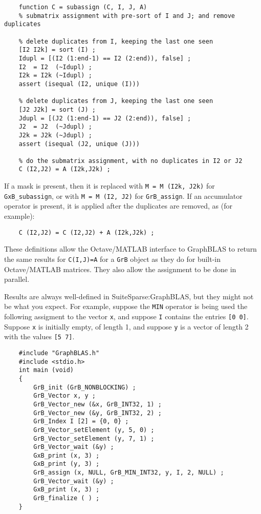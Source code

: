 \documentclass[12pt]{article}
\begin{document}
{{\small
\begin{verbatim}
    function C = subassign (C, I, J, A)
    % submatrix assignment with pre-sort of I and J; and remove duplicates

    % delete duplicates from I, keeping the last one seen
    [I2 I2k] = sort (I) ;
    Idupl = [(I2 (1:end-1) == I2 (2:end)), false] ;
    I2  = I2  (~Idupl) ;
    I2k = I2k (~Idupl) ;
    assert (isequal (I2, unique (I)))

    % delete duplicates from J, keeping the last one seen
    [J2 J2k] = sort (J) ;
    Jdupl = [(J2 (1:end-1) == J2 (2:end)), false] ;
    J2  = J2  (~Jdupl) ;
    J2k = J2k (~Jdupl) ;
    assert (isequal (J2, unique (J)))

    % do the submatrix assignment, with no duplicates in I2 or J2
    C (I2,J2) = A (I2k,J2k) ;
\end{verbatim}}

If a mask is present, then it is replaced with \verb'M = M (I2k, J2k)' for
\verb'GxB_subassign', or with \verb'M = M (I2, J2)' for \verb'GrB_assign'.
If an accumulator operator is present, it is applied after the duplicates
are removed, as (for example):

{\small
\begin{verbatim}
    C (I2,J2) = C (I2,J2) + A (I2k,J2k) ;
\end{verbatim}}

These definitions allow the Octave/MATLAB interface to GraphBLAS to return the same
results for \verb'C(I,J)=A' for a \verb'GrB' object as they do for built-in
Octave/MATLAB matrices.  They also allow the assignment to be done in parallel.

Results are always well-defined in SuiteSparse:GraphBLAS, but they might not be
what you expect.  For example, suppose the \verb'MIN' operator is being used
the following assigment to the vector \verb'x', and suppose \verb'I' contains
the entries \verb'[0 0]'.  Suppose \verb'x' is initially empty, of length 1,
and suppose \verb'y' is a vector of length 2 with the values \verb'[5 7]'.

{\small
\begin{verbatim}
    #include "GraphBLAS.h"
    #include <stdio.h>
    int main (void)
    {
        GrB_init (GrB_NONBLOCKING) ;
        GrB_Vector x, y ;
        GrB_Vector_new (&x, GrB_INT32, 1) ;
        GrB_Vector_new (&y, GrB_INT32, 2) ;
        GrB_Index I [2] = {0, 0} ;
        GrB_Vector_setElement (y, 5, 0) ;
        GrB_Vector_setElement (y, 7, 1) ;
        GrB_Vector_wait (&y) ;
        GxB_print (x, 3) ;
        GxB_print (y, 3) ;
        GrB_assign (x, NULL, GrB_MIN_INT32, y, I, 2, NULL) ;
        GrB_Vector_wait (&y) ;
        GxB_print (x, 3) ;
        GrB_finalize ( ) ;
    }
\end{verbatim}}

}
\end{document}
